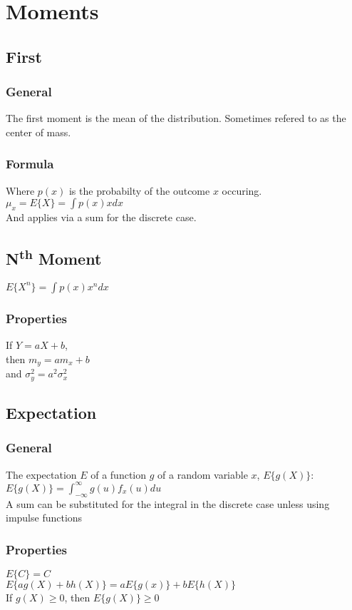 \section*{Moments}
\subsection*{First}

\subsubsection*{General}
The first moment is the mean of the distribution. Sometimes refered to as the center of mass.

\subsubsection*{Formula}
Where $p(x)$ is the probabilty of the outcome $x$ occuring.
$\mu_x=E\{X\}=\int p(x)xdx$\\
And applies via a sum for the discrete case.

\subsection*{N\textsuperscript{th} Moment}
$E\{X^n\}=\int p(x)x^ndx$\\


\subsubsection*{Properties}
If $Y=aX+b$, \\ 
then $m_y=am_x+b$ \\
and 
$\sigma_y^2=a^2\sigma_x^2$

\subsection*{Expectation}
\subsubsection*{General}
The expectation $E$ of a function $g$ of a random variable $x$, $E\{g(X)\}$: \\
$E\{g(X)\}=\int_{-\infty}^{\infty}g(u)f_x(u)du$ \\
A sum can be substituted for the integral in the discrete case unless using impulse functions

\subsubsection*{Properties}
$E\{C\}=C$ \\
$E\{ag(X)+bh(X)\}=aE\{g(x)\}+bE\{h(X)\}$ \\
If $g(X)\geq 0$, then $E\{g(X)\} \geq 0$

